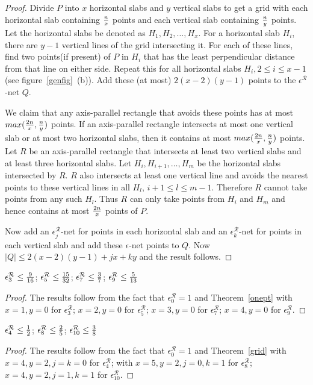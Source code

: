 \begin{proof}
Divide $P$ into $x$ horizontal slabs and $y$ vertical slabs to get a grid with each horizontal slab containing $n\over x$ points and each vertical slab containing
$n\over y$ points. Let the horizontal slabs be denoted as $H_1,H_2,\dots,H_x$. For a horizontal slab $H_i$, there are $y-1$ vertical lines of the grid intersecting it. For each of these lines, find two points(if present) of $P$ in $H_i$ that has the
least perpendicular distance from that line on either side. Repeat this for all horizontal slabs $H_i, 2\leq i \leq x-1$ (see figure~\ref{genfig}~(b)). Add these (at most)
$2(x-2)(y-1)$ points  to the $\epsilon^\mathcal{R}$-net $Q$.

 We claim that any
axis-parallel rectangle that avoids these points has at most $max({2n\over
x},{n\over y})$ points. If an axis-parallel rectangle intersects at most one vertical slab or at most two horizontal slabs, then it contains at most $max({2n\over
x},{n\over y})$ points. Let
$R$ be an axis-parallel rectangle that intersects at least two vertical slabs and at least three horizontal slabs. Let $H_i,H_{i+1},\dots,H_m$ be the horizontal slabs intersected by $R$. 
$R$ also intersects at least one 
vertical line and avoids the nearest points to these vertical lines in all $H_l$, $i+1 \leq l \leq m-1$. Therefore $R$ cannot take  points from any such $H_l$. Thus $R$ can only take points from $H_i$ and $H_m$ and hence contains at most ${2n\over
x}$ points of $P$.  
\vspace{0.1in}


Now add an $\epsilon_j^\mathcal{R}$-net for points in each horizontal slab and an
$\epsilon_k^\mathcal{R}$-net for points in each vertical slab and add these $\epsilon$-net points
to $Q$. Now $|Q|\leq 2(x-2)(y-1)+jx+ky$ and the result follows.

\end{proof} 

\begin{lem}
$\epsilon_3^\mathcal{R}\leq {9\over16}$; $\epsilon_5^\mathcal{R}\leq {15\over32}$;
$\epsilon_7^\mathcal{R}\leq{3\over 7}$; $\epsilon_9^\mathcal{R}\leq{5\over13}$
\end{lem}
\begin{proof}
The results follow from the fact that $\epsilon_0^\mathcal{R}=1$ and Theorem~\ref{onept} with $x=1, y=0$ for
$\epsilon_3^\mathcal{R}$; $x=2, y=0$ for
$\epsilon_5^\mathcal{R}$; $x=3, y=0$ for $\epsilon_7^\mathcal{R}$; $x=4,y=0$ for
$\epsilon_9^\mathcal{R}$.

\end{proof}
\begin{lem}
$\epsilon_4^\mathcal{R}\leq{1\over2}$; $\epsilon_8^\mathcal{R}\leq {2\over5}$;
$\epsilon_{10}^\mathcal{R}\leq{3\over8}$
\end{lem}
\begin{proof}
The results follow from the fact that $\epsilon_0^\mathcal{R}=1$ and Theorem~\ref{grid} with $x=4, y=2,j=k=0$ for
$\epsilon_4^\mathcal{R}$; with $x=5,y=2,j=0,k=1$ for $\epsilon_8^\mathcal{R}$;
$x=4,y=2,j=1,k=1$ for $\epsilon_{10}^\mathcal{R}$.

\end{proof}

